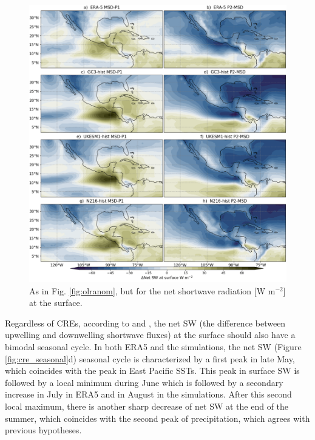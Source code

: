 \begin{figure}[t!]
\includegraphics[width=\linewidth]{figures/fig4_netswdif_3.png}
\caption[Composite shortave differences with MSD timings]{As in Fig. \ref{fig:olranom}, but for the  net shortwave radiation [W m$^{-2}$] at the surface.}
\label{fig:swnet_diff}
\end{figure}

 Regardless of CREs, according to \cite{magana1999} and \cite{karnauskas2013}, the net SW (the difference between upwelling and downwelling shortwave fluxes) at the surface should also have a bimodal seasonal cycle.
In both ERA5 and the simulations, the net SW (Figure \ref{fig:cre_seasonal}d) seasonal cycle is characterized by a first peak in late May, which coincides with the peak in East Pacific SSTs. This peak in surface SW is followed by a local minimum during June which is followed by a secondary increase in July in ERA5 and in August in the simulations. After this second local maximum, there is another sharp decrease of net SW at the end of the summer, which coincides with the second peak of precipitation, which agrees with previous hypotheses. 

